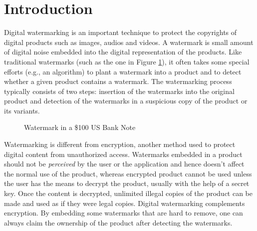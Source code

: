 \section{Introduction}
\label{sec:intro}

Digital watermarking is an important technique to 
protect the copyrights of digital products such as images, audios and
videos. A watermark is small amount of digital noise 
embedded into the digital representation of the products. 
Like traditional watermarks (such as the one in Figure \ref{fig:banknote}),
it often takes some special efforts (e.g., an algorithm) to plant
a watermark into a product and to detect 
whether a given product contains a watermark. The watermarking
process typically consists of two steps: insertion of the watermarks into
the original product and detection of the watermarks in a suspicious
copy of the product or its variants.

\begin{figure}[th]
\centering
{}
\caption{Watermark in a \$100 US Bank Note}
\label{fig:banknote}
\end{figure}

Watermarking is different from encryption, another method used to 
protect digital content from unauthorized access. Watermarks embedded 
in a product should not be {\em perceived} by the user or the application and hence 
doesn't affect the normal use of the product, whereas encrypted product cannot
be used unless the user has the means to decrypt the product, usually
with the help of a secret key.
Once the content is decrypted, unlimited illegal copies of the 
product can be made and used as if they were legal copies. Digital 
watermarking complements encryption. By embedding 
some watermarks that are hard to remove, one can always claim the ownership 
of the product after detecting the watermarks. 
%

